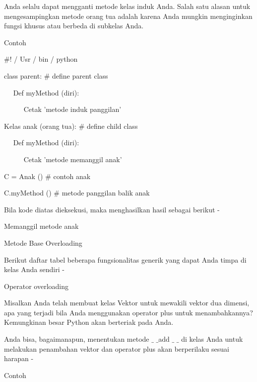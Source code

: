 Anda selalu dapat mengganti metode kelas induk Anda. Salah satu alasan untuk mengesampingkan metode orang tua adalah karena Anda mungkin menginginkan fungsi khusus atau berbeda di subkelas Anda. \par
Contoh \par
\vspace{12pt}
 $  \#  $! / Usr / bin / python \par
\vspace{12pt}
class parent:  $  \#  $ define parent class \par
~~ Def myMethod (diri): \par
~~~~~ Cetak 'metode induk panggilan' \par
\vspace{12pt}
Kelas anak (orang tua):  $  \#  $ define child class \par
~~ Def myMethod (diri): \par
~~~~~ Cetak 'metode memanggil anak' \par
\vspace{12pt}
C = Anak ()  $  \#  $ contoh anak \par
C.myMethod ()  $  \#  $ metode panggilan balik anak \par
\vspace{12pt}
Bila kode diatas dieksekusi, maka menghasilkan hasil sebagai berikut - \par
\vspace{12pt}
Memanggil metode anak \par
\vspace{12pt}
Metode Base Overloading \par
\vspace{12pt}
Berikut daftar tabel beberapa fungsionalitas generik yang dapat Anda timpa di kelas Anda sendiri - \par
\vspace{12pt}
Operator overloading \par
\vspace{12pt}
Misalkan Anda telah membuat kelas Vektor untuk mewakili vektor dua dimensi, apa yang terjadi bila Anda menggunakan operator plus untuk menambahkannya? Kemungkinan besar Python akan berteriak pada Anda. \par
\vspace{12pt}
Anda bisa, bagaimanapun, menentukan metode  $  \_  $ $  \_  $add $  \_  $ $  \_  $ di kelas Anda untuk melakukan penambahan vektor dan operator plus akan berperilaku sesuai harapan - \par
Contoh \par
